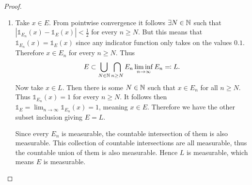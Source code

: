 \documentclass[hw_all.tex]{subfiles}
\begin{document}
\begin{proof}
    \begin{enumerate}
        \item
            Take $x \in E$. From pointwise convergence it follows $\exists N \in \mathbb{N}$ such that $|\mathds{1}_{E_n}(x) - \mathds{1}_{E}(x)| < \frac{1}{2}$ for every $n \geq N$. But this means that $\mathds{1}_{E_n}(x) = \mathds{1}_{E}(x)$ since any indicator function only takes on the values $\qty{0,1}$. Therefore $x \in E_n$ for every $n \geq N$. Thus
            \[
                E \subset \bigcup_{N \in \mathbb{N}} \bigcap_{n \geq N} E_n \liminf_{n \to \infty} E_n \eqcolon L
            .\]
            Now take $x \in L$. Then there is some $N \in \mathbb{N}$ such that $x \in E_n$ for all $n \geq N$. Thus $\mathds{1}_{E_n}(x) = 1$ for every $n \geq N$. It follows then $\mathds{1}_{E} = \lim_{n \to \infty} \mathds{1}_{E_n}(x) = 1$, meaning $x \in E$. Therefore we have the other subset inclusion giving $E = L$.

            Since every $E_n$ is measurable, the countable intersection of them is also measurable. This collection of countable intersections are all measurable, thus the countable union of them is also measurable. Hence $L$ is measurable, which means $E$ is measurable.


\end{enumerate}
\end{proof}
\end{document}

